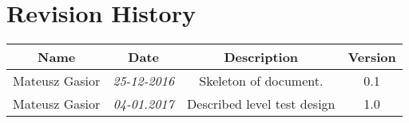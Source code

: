 \chapter*{Revision History}

\begin{center}
    \begin{tabular}{|c|c|c|c|}
        \hline
	    Name & Date & Description & Version\\ \hline
	    Mateusz Gasior & \emph{25-12-2016} & Skeleton of document. & 0.1 \\ \hline
	    Mateusz Gasior & \emph{04-01.2017} & Described level test design & 1.0 \\
        \hline
    \end{tabular}
\end{center}
